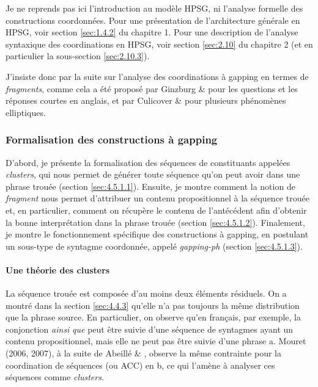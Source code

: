 Je ne reprends pas ici l'introduction au modèle HPSG, ni l'analyse formelle des constructions coordonnées. Pour une présentation de l'architecture générale en HPSG, voir section \ref{sec:1.4.2} du chapitre 1. Pour une description de l'analyse syntaxique des coordinations en HPSG, voir section \ref{sec:2.10} du chapitre 2 (et en particulier la sous-section \ref{sec:2.10.3}). 

J'insiste donc par la suite sur l'analyse des coordinations à gapping en termes de \textit{fragments}, comme cela a été proposé par Ginzburg \& \citet{Sag2000} pour les questions et les réponses courtes en anglais, et par Culicover \& \citet{Jackendoff2005} pour plusieurs phénomènes elliptiques.  

\subsubsection{Formalisation des constructions à gapping}
\label{bkm:Ref300002542}D'abord, je présente la formalisation des séquences de constituants appelées \textit{clusters}, qui nous permet de générer toute séquence qu'on peut avoir dans une phrase trouée (section \ref{sec:4.5.1.1}). Ensuite, je montre comment la notion de \textit{fragment} nous permet d'attribuer un contenu propositionnel à la séquence trouée et, en particulier, comment on récupère le contenu de l'antécédent afin d'obtenir la bonne interprétation dans la phrase trouée (section \ref{sec:4.5.1.2}). Finalement, je montre le fonctionnement spécifique des constructions à gapping, en postulant un sous-type de syntagme coordonnée, appelé \textit{gapping-ph} (section \ref{sec:4.5.1.3}).

\paragraph[Une théorie des clusters]{Une théorie des clusters}
\label{bkm:Ref299904255}\label{bkm:Ref299987535}La séquence trouée est composée d'au moins deux éléments résiduels. On a montré dans la section \ref{sec:4.4.3} qu'elle n'a pas toujours la même distribution que la phrase source. En particulier, on observe qu'en français, par exemple, la conjonction \textit{ainsi} \textit{que} peut être suivie d'une séquence de syntagmes ayant un contenu propositionnel, mais elle ne peut pas être suivie d'une phrase a. Mouret (2006, 2007), à la suite de Abeillé \& \citet{Godard1996}, observe la même contrainte pour la coordination de séquences (ou ACC) en b, ce qui l'amène à analyser ces séquences comme \textit{clusters}.


